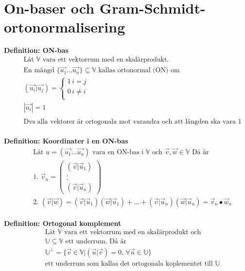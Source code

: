 \section{On-baser och Gram-Schmidt-ortonormalisering}
\textbf{Definition: ON-bas}
\begin{align*}
  &\quad  \text{Låt $\mathbb{V}$ vara ett vektorrum med en skalärprodukt. } \\
  &\quad  \text{En mängd $\{ \vec{u_1} \ldots \vec{u_n} \} \subseteq \mathbb{V}$ kallas ortonormal (ON) om} \\
  &\quad  (\vec{u_i}|\vec{u_j}) = 
  \left\{\begin{array}{rr}
  1 \, i = j \\
  0 \, i \neq i  \\
  \end{array}\right. \\
  &\quad  |\vec{u_i}| = 1 \\
  &\quad  \\
  &\quad  \text{Dvs alla vektorer är ortogonala mot varandra och att längden ska vara $1$} \\
\end{align*}

\textbf{Definition: Koordinater i en ON-bas}
\begin{align*}
  &\quad  \text{Låt $\underline{u} = (\vec{u_1} \ldots \vec{u_n})$ vara en ON-bas i $\mathbb{V}$ och }
  \vec{v}, \vec{w} \in\mathbb{V} \text{ Då är} \\
  &\quad  \text{1. } \vec{v}_{\underline{u}} =
  \begin{pmatrix} (\vec{v}|\vec{u}_1) \\ . \\ . \\ (\vec{v}|\vec{u}_n) \end{pmatrix} \\
  &\quad  \text{2. } (\vec{v}|\vec{w}) =
  (\vec{v}|\vec{u}_1)(\vec{w}|\vec{u}_1)+ \ldots +(\vec{v}|\vec{u}_n)(\vec{w}|\vec{u}_n) = \vec{v}_n \bullet \vec{w}_n \\
\end{align*}

\textbf{Definition: Ortogonal komplement}
\begin{align*}
  &\quad  \text{Låt $\mathbb{V}$ vara ett vektorrum med en skalärprodukt och } \\
  &\quad  \mathbb{U} \subseteq \mathbb{V} \text{ ett underrum. Då är} \\
  &\quad  \mathbb{U}^{\perp} = \{ \vec{v}\in\mathbb{V} | (\vec{u}|\vec{v}) = 0, \, \forall \vec{u} \in \mathbb{U} \} \\
  &\quad  \text{ett underrum som kallas det ortogonala koplementet till } \mathbb{U} \\
\end{align*}

